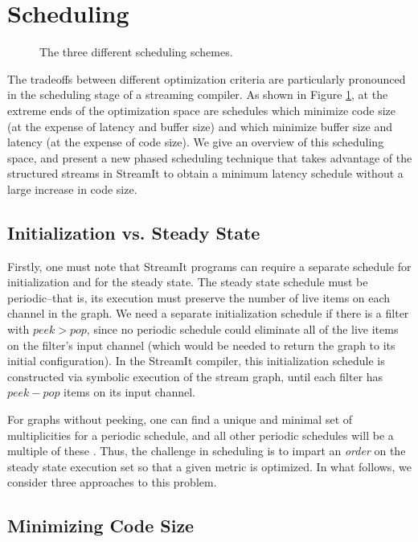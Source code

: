 \section{Scheduling}

\begin{figure}
\centering
{}
\caption{The three different scheduling schemes.}
\label{fig:sched}
\end{figure}

The tradeoffs between different optimization criteria are particularly
pronounced in the scheduling stage of a streaming compiler.  As shown
in Figure \ref{fig:sched}, at the extreme ends of the optimization
space are schedules which minimize code size (at the expense of
latency and buffer size) and which minimize buffer size and latency
(at the expense of code size).  We give an overview of this scheduling
space, and present a new phased scheduling technique that takes
advantage of the structured streams in StreamIt to obtain a minimum
latency schedule without a large increase in code size.

\subsection{Initialization vs. Steady State}

Firstly, one must note that StreamIt programs can require a separate
schedule for initialization and for the steady state.  The steady
state schedule must be periodic--that is, its execution must preserve
the number of live items on each channel in the graph.  We need a
separate initialization schedule if there is a filter with $peek >
pop$, since no periodic schedule could eliminate all of the live items
on the filter's input channel (which would be needed to return the
graph to its initial configuration).  In the StreamIt compiler, this
initialization schedule is constructed via symbolic execution of the
stream graph, until each filter has $peek-pop$ items on its input
channel.

For graphs without peeking, one can find a unique and minimal set of
multiplicities for a periodic schedule, and all other periodic
schedules will be a multiple of these \cite{leesdf}.  Thus, the
challenge in scheduling is to impart an {\it order} on the steady
state execution set so that a given metric is optimized.  In what
follows, we consider three approaches to this problem.

\subsection{Minimizing Code Size}

